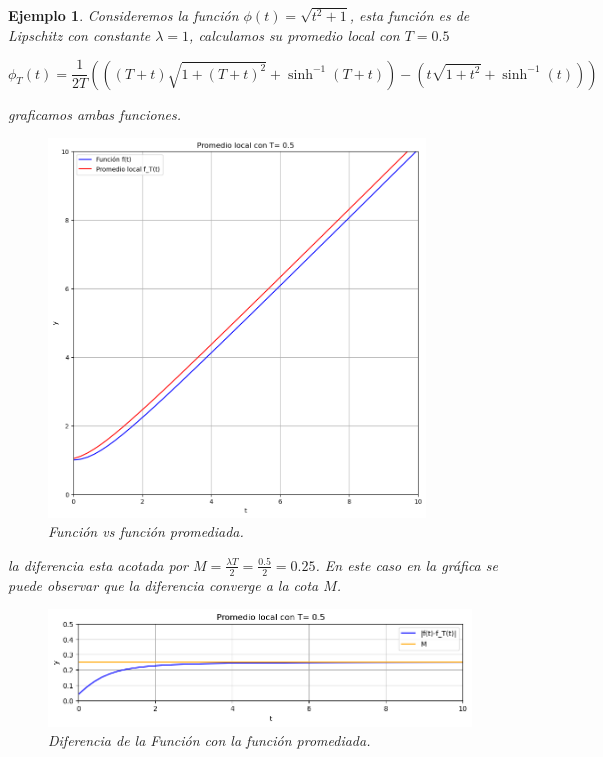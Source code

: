 \documentclass[12pt, a4paper]{report}
\newtheorem{example}{Ejemplo}
\begin{document}
\begin{example}
	Consideremos la función $\phi(t)=\sqrt{t^2+1}$, esta función es de Lipschitz
	con constante $\lambda=1$, calculamos su promedio local con $T=0.5$

	$$\phi_T(t)=\frac{1}{2T}(((T + t)\sqrt{1 + (T + t)^2} + \sinh^{-1}(T + t)) - (t\sqrt{1 + t^2} + \sinh^{-1}(t)))$$

	graficamos ambas funciones.

	\begin{figure}[h]
		\centering
		\includegraphics[width=10cm]{fl.png}
		\caption{Función vs  función promediada.}
	\end{figure}

	la diferencia esta acotada por $M=\frac{\lambda T}{2}=\frac{0.5}{2}=0.25$. En este caso en la
	gráfica se puede observar que la diferencia converge a la cota $M$.

	\begin{figure}[h]
		\centering
		\includegraphics[width=13cm]{d.png}
		\caption{Diferencia de la Función con la función promediada.}
	\end{figure}

\end{example}
\end{document}
